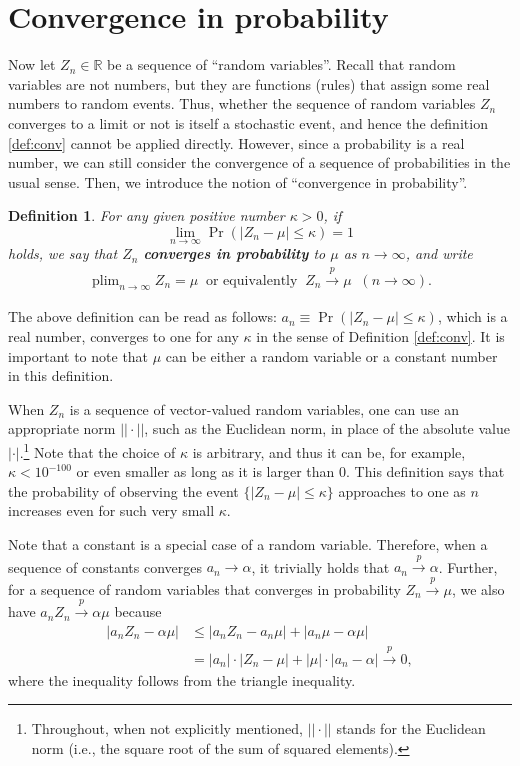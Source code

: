 \documentclass[10.5pt, A4paper, openany, uplatex]{book}
\DeclareMathOperator*{\plim}{plim}
\newcommand{\mbb}{\mathbb}
\newtheorem{definition}[theorem]{Definition}
\numberwithin{equation}{section}
\begin{document}
\section{Convergence in probability}\label{subsec:inprob}

Now let $Z_n \in \mbb{R}$ be a  sequence of ``random variables''.
Recall that random variables are not numbers, but they are functions (rules) that assign some real numbers to random events.
Thus, whether the sequence of random variables $Z_n$ converges to a limit or not is itself a stochastic event, and hence the definition \ref{def:conv} cannot be applied directly.
However, since a probability is a real number, we can still consider the convergence of a sequence of probabilities in the usual sense.
Then, we introduce the notion of ``convergence in probability''.

\begin{definition}
For any given positive number $\kappa > 0$, if
\[
	\lim_{n \to \infty} \Pr(|Z_n - \mu| \le \kappa) = 1
\]
holds, we say that $Z_n$ \textbf{converges in probability} to $\mu$ as $n \to \infty$, and write 
\begin{align*}
 \plim_{n \to \infty} Z_n = \mu \;\; \text{or equivalently} \;\; Z_n \overset{p}{\to} \mu \;\; (n\to\infty).
\end{align*}
\end{definition}

The above definition can be read as follows: $a_n \equiv \Pr(|Z_n - \mu| \le \kappa)$, which is a real number, converges to one for any $\kappa$ in the sense of Definition \ref{def:conv}.
It is important to note that $\mu$ can be either a random variable or a constant number in this definition.

When $Z_n$ is a sequence of vector-valued random variables, one can use an appropriate norm $||\cdot||$, such as the Euclidean norm, in place of the absolute value $|\cdot|$.\footnote{
	Throughout, when not explicitly mentioned, $||\cdot||$ stands for the Euclidean norm (i.e., the square root of the sum of squared elements).
}
Note that the choice of $\kappa$ is arbitrary, and thus it can be, for example, $\kappa < 10^{-100}$ or even smaller as long as it is larger than 0.
This definition says that the probability of observing the event $\{|Z_n - \mu| \le \kappa\}$ approaches to one as $n$ increases even for such very small $\kappa$. 

Note that a constant is a special case of a random variable.
Therefore, when a sequence of constants converges $a_n \to \alpha$, it trivially holds that $a_n \overset{p}{\to} \alpha$.
Further, for a sequence of random variables that converges in probability $Z_n \overset{p}{\to} \mu$, we also have $a_n Z_n  \overset{p}{\to} \alpha \mu $ because
\begin{align*}
	|a_n Z_n - \alpha \mu| 
	& \le |a_n Z_n - a_n \mu| + |a_n \mu - \alpha \mu|\\
	& = |a_n| \cdot |Z_n - \mu| + |\mu| \cdot |a_n - \alpha| \overset{p}{\to} 0,
\end{align*}
where the inequality follows from the triangle inequality.
\end{document}

